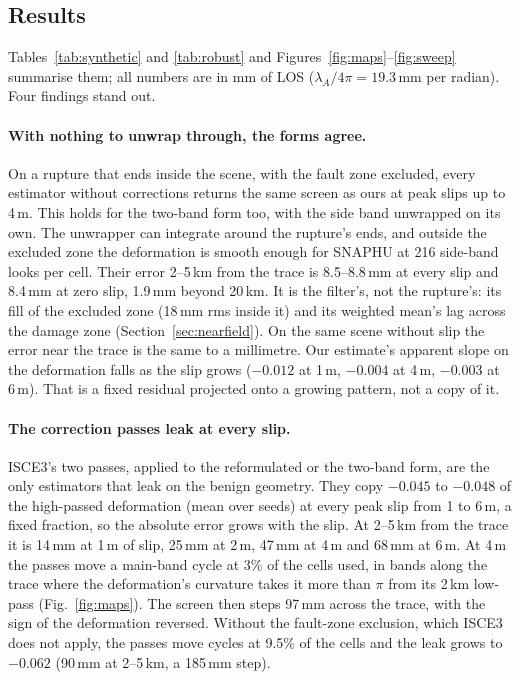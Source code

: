 \subsection{Results}
Tables~\ref{tab:synthetic} and \ref{tab:robust} and Figures~\ref{fig:maps}--\ref{fig:sweep} summarise them; all
numbers are in mm of LOS ($\lambda_A/4\pi = 19.3$\,mm per radian). Four findings stand out.

\paragraph{With nothing to unwrap through, the forms agree.} On a rupture that ends inside the scene, with the fault
zone excluded, every estimator without corrections returns the same screen as ours at peak slips up to 4\,m. This
holds for the two-band form too, with the side band unwrapped on its own. The unwrapper can integrate around the
rupture's ends, and outside the excluded zone the deformation is smooth enough for SNAPHU at 216 side-band looks per
cell. Their error 2--5\,km from the trace is 8.5--8.8\,mm at every slip and 8.4\,mm at zero slip, 1.9\,mm beyond
20\,km. It is the filter's, not the rupture's: its fill of the excluded zone (18\,mm rms inside it) and its weighted
mean's lag across the damage zone (Section~\ref{sec:nearfield}). On the same scene without slip the error near the
trace is the same to a millimetre. Our estimate's apparent slope on the
deformation falls as the slip grows ($-0.012$ at 1\,m, $-0.004$ at 4\,m, $-0.003$ at 6\,m). That is a fixed residual
projected onto a growing pattern, not a copy of it.

\paragraph{The correction passes leak at every slip.} ISCE3's two passes, applied to the reformulated or the two-band
form, are the only estimators that leak on the benign geometry. They copy $-0.045$ to $-0.048$ of the high-passed
deformation (mean over seeds) at every peak slip from 1 to 6\,m, a fixed fraction, so the absolute error grows with the slip. At
2--5\,km from the trace it is 14\,mm at 1\,m of slip, 25\,mm at 2\,m, 47\,mm at 4\,m and 68\,mm at 6\,m. At 4\,m the
passes move a main-band cycle at 3\% of the cells used, in bands along the trace where the deformation's curvature
takes it more than $\pi$ from its 2\,km low-pass (Fig.~\ref{fig:maps}). The screen then steps 97\,mm across the trace,
with the sign of the deformation reversed. Without the fault-zone exclusion, which ISCE3 does not apply, the passes
move cycles at 9.5\% of the cells and the leak grows to $-0.062$ (90\,mm at 2--5\,km, a 185\,mm step).

